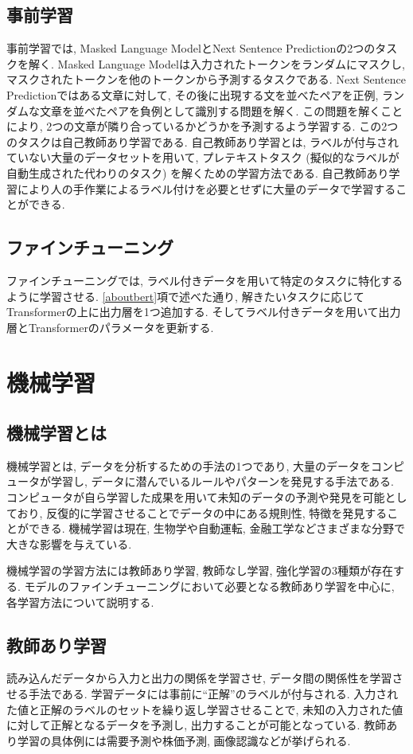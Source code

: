 \subsection{事前学習}
事前学習では, Masked Language ModelとNext Sentence Predictionの2つのタスクを解く. Masked Language Modelは入力されたトークンをランダムにマスクし, マスクされたトークンを他のトークンから予測するタスクである. Next Sentence Predictionではある文章に対して, その後に出現する文を並べたペアを正例, ランダムな文章を並べたペアを負例として識別する問題を解く. この問題を解くことにより, 2つの文章が隣り合っているかどうかを予測するよう学習する. 
この2つのタスクは自己教師あり学習である. 自己教師あり学習とは, ラベルが付与されていない大量のデータセットを用いて, プレテキストタスク (擬似的なラベルが自動生成された代わりのタスク) を解くための学習方法である. 自己教師あり学習により人の手作業によるラベル付けを必要とせずに大量のデータで学習することができる. 

\subsection{ファインチューニング}
ファインチューニングでは, ラベル付きデータを用いて特定のタスクに特化するように学習させる. \ref{aboutbert}項で述べた通り, 解きたいタスクに応じてTransformerの上に出力層を1つ追加する. そしてラベル付きデータを用いて出力層とTransformerのパラメータを更新する. 


\section{機械学習}
\subsection{機械学習とは}
機械学習とは, データを分析するための手法の1つであり, 大量のデータをコンピュータが学習し, データに潜んでいるルールやパターンを発見する手法である. コンピュータが自ら学習した成果を用いて未知のデータの予測や発見を可能としており, 反復的に学習させることでデータの中にある規則性, 特徴を発見することができる. 機械学習は現在, 生物学や自動運転, 金融工学などさまざまな分野で大きな影響を与えている. 

機械学習の学習方法には教師あり学習, 教師なし学習, 強化学習の3種類が存在する. モデルのファインチューニングにおいて必要となる教師あり学習を中心に, 各学習方法について説明する. 

\subsection{教師あり学習}
読み込んだデータから入力と出力の関係を学習させ, データ間の関係性を学習させる手法である. 学習データには事前に``正解''のラベルが付与される. 
入力された値と正解のラベルのセットを繰り返し学習させることで, 未知の入力された値に対して正解となるデータを予測し, 出力することが可能となっている. 
教師あり学習の具体例には需要予測や株価予測, 画像認識などが挙げられる. 

